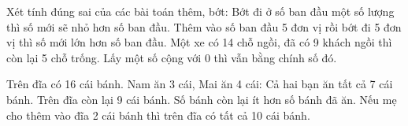 \begin{ex} %
Xét tính đúng sai của các bài toán thêm, bớt:
\choiceTF
{\True Bớt đi ở số ban đầu một số lượng thì số mới sẽ nhỏ hơn số ban đầu.}
{Thêm vào số ban đầu 5 đơn vị rồi bớt đi 5 đơn vị thì số mới lớn hơn số ban đầu.}
{\True Một xe có 14 chỗ ngồi, đã có 9 khách ngồi thì còn lại 5 chỗ trống.}
{\True Lấy một số cộng với 0 thì vẫn bằng chính số đó.}
\end{ex}

\begin{ex} %
Trên đĩa có 16 cái bánh. Nam ăn 3 cái, Mai ăn 4 cái:
\choiceTF
{\True Cả hai bạn ăn tất cả 7 cái bánh.}
{\True Trên đĩa còn lại 9 cái bánh.}
{Số bánh còn lại ít hơn số bánh đã ăn.}
{Nếu mẹ cho thêm vào đĩa 2 cái bánh thì trên đĩa có tất cả 10 cái bánh.}
\end{ex}

